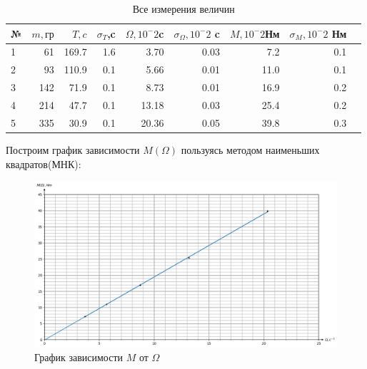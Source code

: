 \documentclass[a4paper,12pt]{article} %
\begin{document}
\begin{table}[h!]
\begin{center}
\label{table2}
\begin{tabular}{|l|r|r|r|r|r|r|r|r|}\hline
        № & $m,гр$ &$T,c$&$\sigma_{T}$,c&$\Omega, 10^-2$c &$\sigma_{\Omega}, 10^-2$ c &$M, 10^-2$Нм&$\sigma_{M}, 10^-2$ Нм \\ \hline
        1 &  61  &  169.7 &  1.6 &  3.70    &  0.03    &  7.2      &  0.1\\ \hline
        2 &  93  &  110.9 &  0.1 &  5.66    &  0.01    &  11.0     &  0.1\\ \hline
        3 &  142 &  71.9  &  0.1 &  8.73    &  0.01    &  16.9     &  0.2\\ \hline
        4 &  214 &  47.7  &  0.1 &  13.18   &  0.03    &  25.4     &  0.2\\ \hline
        5 &  335 &  30.9  &  0.1 &  20.36   &  0.05    &  39.8     &  0.3\\ \hline
\end{tabular}
\caption{Все измерения величин}
\end{center}
\end{table}

Построим график зависимости $M(\Omega)$ пользуясь методом наименьших квадратов(МНК):
\begin{figure}[!h]
    \begin{center}
        \includegraphics[width=1\textwidth]{graphic}
        \caption{График зависимости $M$ от $\Omega$}
        \label{graphic1}
    \end{center}
\end{figure}
\end{document}
